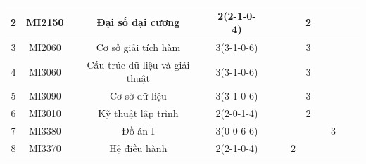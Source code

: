 \documentclass[12pt,a4paper]{report}
\begin{document}
\begin{landscape}
\begin{longtable}[c]{|c|c|c|c|c|c|c|c|c|c|c|c|}
        2                             & MI2150                          & Đại số đại cương                                             & 2(2-1-0-4)                                                                           &             &             &             & 2           &             &             &             &             \\ \hline
        3                             & MI2060                          & Cơ sở giải tích hàm                                          & 3(3-1-0-6)                                                                           &             &             &             & 3           &             &             &             &             \\ \hline
        4                             & MI3060                          & Cấu trúc dữ liệu và giải thuật                               & 3(3-1-0-6)                                                                           &             &             &             & 3           &             &             &             &             \\ \hline
        5                             & MI3090                          & Cơ sở dữ liệu                                                & 3(3-1-0-6)                                                                           &             &             &             & 3           &             &             &             &             \\ \hline
        6                             & MI3010                          & Kỹ thuật lập trình                                           & 2(2-0-1-4)                                                                           &             &             &             & 2           &             &             &             &             \\ \hline
        7                             & MI3380                          & Đồ án I                                                      & 3(0-0-6-6)                                                                           &             &             &             &             &             & 3           &             &             \\ \hline
        8                             & MI3370                          & Hệ điều hành                                                 & 2(2-1-0-4)                                                                           &             &             & 2           &             &             &             &             &             \\ \hline

\end{longtable}
\end{landscape}
\end{document}
